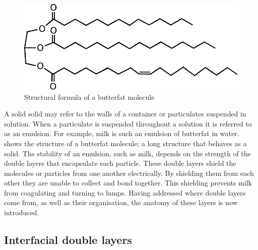     \begin{figure}
        \begin{center}
            \includegraphics[scale=0.8]{content/introduction/graphics/butterfat}
        \end{center}
        \caption{Structural formula of a butterfat molecule}
        \label{fig:butterfat}
    \end{figure}
    A solid solid may refer to the walls of a container or particulates suspended in solution.
    When a particulate is suspended throughout a solution it is referred to as an emulsion.
    For example, milk is such an emulsion of butterfat in water.
     shows the structure of a butterfat molecule; a long structure that behaves as a solid.
    The stability of an emulsion, such as milk, depends on the strength of the double layers that encapsulate each particle.
    These double layers shield the molecules or particles from one another electrically.
    By shielding them from each other they are unable to collect and bond together.
    This shielding prevents milk from coagulating and turning to lumps.
    Having addressed where double layers come from, as well as their organisation, the anatomy of these layers is now introduced.


  \subsection{Interfacial double layers}


